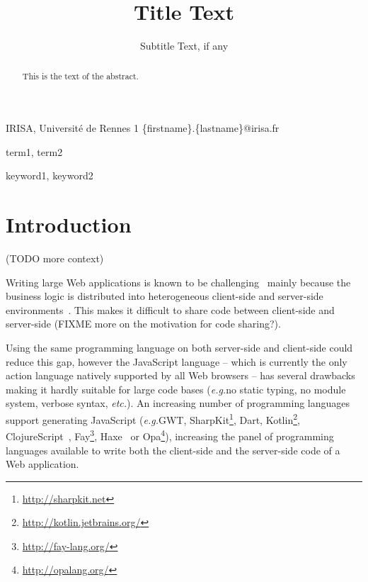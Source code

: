 \documentclass[preprint]{sigplanconf}
\newcommand{\eg}{\emph{e.g.}}
\newcommand{\etc}{\emph{etc.}}
\begin{document}
\copyrightdata{[to be supplied]} 


\title{Title Text}
\subtitle{Subtitle Text, if any}

           {IRISA, Université de Rennes 1}
           {\{firstname\}.\{lastname\}@irisa.fr}

\maketitle

\begin{abstract}
This is the text of the abstract.
\end{abstract}


\terms
term1, term2

\keywords
keyword1, keyword2

\section{Introduction}

(TODO more context)

Writing large Web applications is known to be
challenging~\cite{Mikkonen08_SpaghettiJs,Preciado05_RIAMethodologyNecessity} mainly because the business logic is
distributed into heterogeneous client-side and server-side
environments~\cite{Echeverria09_RIA,Kuuskeri09_PartitioningClientServer}. This makes it difficult to share code
between client-side and server-side (FIXME more on the motivation for code sharing?).

Using the same programming language on both server-side and client-side could reduce this gap, however the JavaScript
language -- which is currently the only action language natively supported by all Web browsers -- has several
drawbacks making it hardly suitable for large code bases (\eg no static typing, no module system, verbose syntax,
\etc). An increasing number of programming languages support generating JavaScript (\eg GWT,
SharpKit\footnote{\href{http://sharpkit.net}{http://sharpkit.net}}, Dart,
Kotlin\footnote{\href{http://kotlin.jetbrains.org/}{http://kotlin.jetbrains.org/}},
ClojureScript~\cite{McGranaghan11_ClojureScript}, Fay\footnote{\href{http://fay-lang.org/}{http://fay-lang.org/}},
Haxe~\cite{Cannasse08_HaXe} or Opa\footnote{\href{http://opalang.org/}{http://opalang.org/}}), increasing the panel
of programming languages available to write both the client-side and the server-side code of a Web application.
\end{document}
